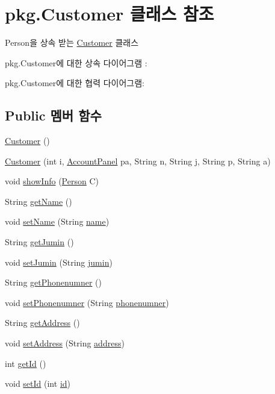 \hypertarget{classpkg_1_1_customer}{}\section{pkg.\+Customer 클래스 참조}
\label{classpkg_1_1_customer}


Person을 상속 받는 \hyperlink{classpkg_1_1_customer}{Customer} 클래스  




pkg.\+Customer에 대한 상속 다이어그램 \+: 


pkg.\+Customer에 대한 협력 다이어그램\+:
\subsection*{Public 멤버 함수}
\begin{DoxyCompactItemize}
\item 
\hyperlink{classpkg_1_1_customer_a1e319002fa53660030640331a89248d2}{Customer} ()
\item 
\hyperlink{classpkg_1_1_customer_aae3adee634c4d4096296944f05309181}{Customer} (int i, \hyperlink{classpkg_1_1_account_panel}{Account\+Panel} pa, String n, String j, String p, String a)
\item 
void \hyperlink{classpkg_1_1_customer_aec3b5bf0653139fc2ec95b2e7a6927e9}{show\+Info} (\hyperlink{classpkg_1_1_person}{Person} C)
\item 
String \hyperlink{classpkg_1_1_person_ab524891b4990ebc4792ee2b8ad7748df}{get\+Name} ()
\item 
void \hyperlink{classpkg_1_1_person_ae7d5ce841c73e816d0f6751c8a7c0b22}{set\+Name} (String \hyperlink{classpkg_1_1_person_a37fd1fe3cf039df98ffca54df6002bb6}{name})
\item 
String \hyperlink{classpkg_1_1_person_aae5ac75c9dd518c4f88b2bcdb51c11d1}{get\+Jumin} ()
\item 
void \hyperlink{classpkg_1_1_person_ab1124c006fbc8ce0e0b9daab2c8422bd}{set\+Jumin} (String \hyperlink{classpkg_1_1_person_aef72766ac67a0af8074b513d00c523f8}{jumin})
\item 
String \hyperlink{classpkg_1_1_person_ad385ada4f1bfde67bbc9fbe8681277f0}{get\+Phonenumner} ()
\item 
void \hyperlink{classpkg_1_1_person_ab2ab58ad8afdb5edaa73ee57b63b657d}{set\+Phonenumner} (String \hyperlink{classpkg_1_1_person_aa7a67349f91a08a8cc45067354653c1d}{phonenumner})
\item 
String \hyperlink{classpkg_1_1_person_a590b6e7e8f71c26f427bdbbd4594ffd1}{get\+Address} ()
\item 
void \hyperlink{classpkg_1_1_person_aa74c6a07ade9f2fb7d7fa02be6fcf391}{set\+Address} (String \hyperlink{classpkg_1_1_person_a692aadebf7edf808fbcbacbcaed07ef3}{address})
\item 
int \hyperlink{classpkg_1_1_person_a2da9408fa69eac5cd12efdbdf93b82ed}{get\+Id} ()
\item 
void \hyperlink{classpkg_1_1_person_ac3efab3a29aa4fabc4163f6d3c633906}{set\+Id} (int \hyperlink{classpkg_1_1_person_acd3bca96258af32adc1eca89b74222a6}{id})
\end{DoxyCompactItemize}
